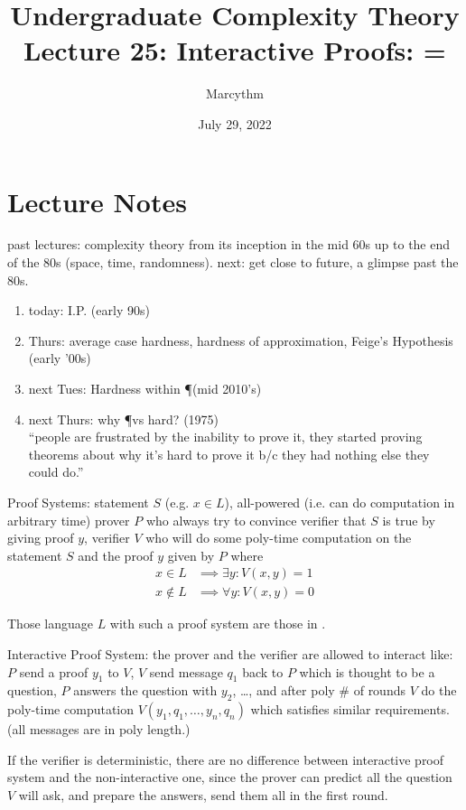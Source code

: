 \documentclass{article}
\title{Undergraduate Complexity Theory \\ Lecture 25: Interactive Proofs: \IP = \PSPACE}
\author{Marcythm}
\date{July 29, 2022}
\begin{document}
\maketitle{}

\section{Lecture Notes}

past lectures: complexity theory from its inception in the mid 60s up to the end of the 80s (space, time, randomness).
next: get close to future, a glimpse past the 80s.

\begin{enumerate}
  \item today: I.P. (early 90s)
  \item Thurs: average case hardness, hardness of approximation, Feige's Hypothesis (early '00s)
  \item next Tues: Hardness within \P (mid 2010's)
  \item next Thurs: why \P vs \NP hard? (1975) \\
  ``people are frustrated by the inability to prove it, they started proving theorems about why it's hard to prove it b/c they had nothing else they could do.''
\end{enumerate}

Proof Systems: statement \(S\) (e.g. \(x \in L\)), all-powered (i.e. can do computation in arbitrary time) prover \(P\) who always try to convince verifier that \(S\) is true by giving proof \(y\), verifier \(V\) who will do some poly-time computation on the statement \(S\) and the proof \(y\) given by \(P\) where
\[ \begin{aligned}
  x \in L &\implies \exists y: V(x, y) = 1 \\
  x \notin L &\implies \forall y: V(x, y) = 0
\end{aligned} \]

Those language \(L\) with such a proof system are those in \NP.

Interactive Proof System: the prover and the verifier are allowed to interact like: \(P\) send a proof \(y_1\) to \(V\), \(V\) send message \(q_1\) back to \(P\) which is thought to be a question, \(P\) answers the question with \(y_2\), \ldots, and after poly \# of rounds \(V\) do the poly-time computation \(V(y_1, q_1, \ldots, y_n, q_n)\) which satisfies similar requirements. (all messages are in poly length.)

\begin{fact}
  If the verifier is deterministic, there are no difference between interactive proof system and the non-interactive one, since the prover can predict all the question \(V\) will ask, and prepare the answers, send them all in the first round.
\end{fact}
\end{document}
